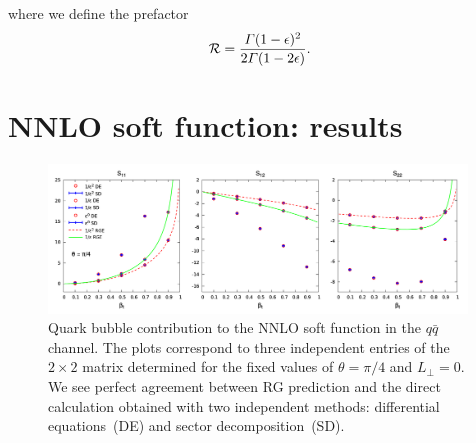 \documentclass[a4paper,11pt]{article}
\newcommand{\qqbar}{{\ensuremath{q \bar q}}\xspace}
\newcommand{\calR}{{\cal R}}
\newcommand{\LT}{L_\perp}
\numberwithin{equation}{section}
\begin{document}
where we define the prefactor
%
\begin{equation}
  \calR = \frac{\Gamma(1-\epsilon)^2}{2\Gamma(1-2\epsilon)}.
\end{equation}


\section{NNLO soft function: results}
\label{sec:results}

\begin{figure}[t]
  \begin{center}
    \includegraphics[width=0.99\textwidth]{plots/soft-function-qq-qbub-beta.png}
  \end{center}
  \caption{
  Quark bubble contribution to the NNLO soft function in the \qqbar channel.
  The plots correspond to three independent entries of the $2\times 2$ matrix
  determined for the fixed values of $\theta = \pi/4$ and $\LT = 0$.
  We see perfect agreement between RG prediction and the direct calculation
  obtained with two independent methods: differential equations~(DE) and sector
  decomposition~(SD).
  }
  \label{fig:quarkbubbleqq}
\end{figure}
\end{document}
